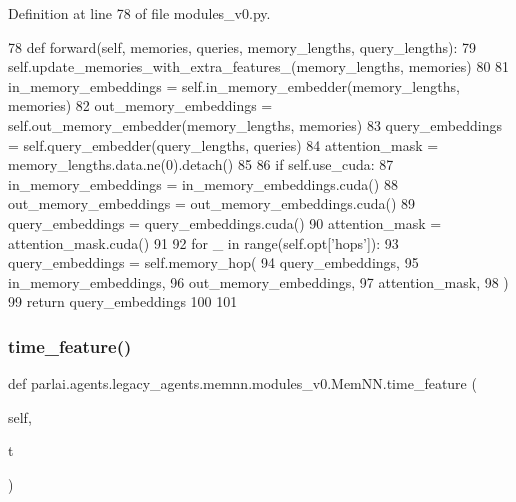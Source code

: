 Definition at line 78 of file modules\+\_\+v0.\+py.


\begin{DoxyCode}
78     \textcolor{keyword}{def }forward(self, memories, queries, memory\_lengths, query\_lengths):
79         self.update\_memories\_with\_extra\_features\_(memory\_lengths, memories)
80 
81         in\_memory\_embeddings = self.in\_memory\_embedder(memory\_lengths, memories)
82         out\_memory\_embeddings = self.out\_memory\_embedder(memory\_lengths, memories)
83         query\_embeddings = self.query\_embedder(query\_lengths, queries)
84         attention\_mask = memory\_lengths.data.ne(0).detach()
85 
86         \textcolor{keywordflow}{if} self.use\_cuda:
87             in\_memory\_embeddings = in\_memory\_embeddings.cuda()
88             out\_memory\_embeddings = out\_memory\_embeddings.cuda()
89             query\_embeddings = query\_embeddings.cuda()
90             attention\_mask = attention\_mask.cuda()
91 
92         \textcolor{keywordflow}{for} \_ \textcolor{keywordflow}{in} range(self.opt[\textcolor{stringliteral}{'hops'}]):
93             query\_embeddings = self.memory\_hop(
94                 query\_embeddings,
95                 in\_memory\_embeddings,
96                 out\_memory\_embeddings,
97                 attention\_mask,
98             )
99         \textcolor{keywordflow}{return} query\_embeddings
100 
101 
\end{DoxyCode}
\mbox{\label{classparlai_1_1agents_1_1legacy__agents_1_1memnn_1_1modules__v0_1_1MemNN_ab1188b15b34f67153ac59258d646397b}} 
\subsubsection{\texorpdfstring{time\+\_\+feature()}{time\_feature()}}
{\footnotesize\ttfamily def parlai.\+agents.\+legacy\+\_\+agents.\+memnn.\+modules\+\_\+v0.\+Mem\+N\+N.\+time\+\_\+feature (\begin{DoxyParamCaption}\item[{}]{self,  }\item[{}]{t }\end{DoxyParamCaption})}




